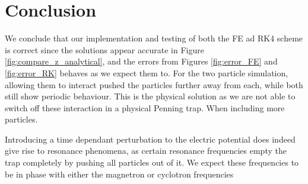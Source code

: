\section{Conclusion}\label{sec:conclusion}

We conclude that our implementation and testing of both the FE ad RK4 scheme is correct since the solutions appear accurate in Figure \ref{fig:compare_z_analytical}, and the errors from Figures \ref{fig:error_FE} and \ref{fig:error_RK} behaves as we expect them to. For the two particle simulation, allowing them to interact pushed the particles further away from each, while both still show periodic behaviour. This is the physical solution as we are not able to switch off these interaction in a physical Penning trap. When including more particles. 

Introducing a time dependant perturbation to the electric potential does indeed give rise to resonance phenomena, as certain resonance frequencies empty the trap completely by pushing all particles out of it. We expect these frequencies to be in phase with either the magnetron or cyclotron frequencies 

